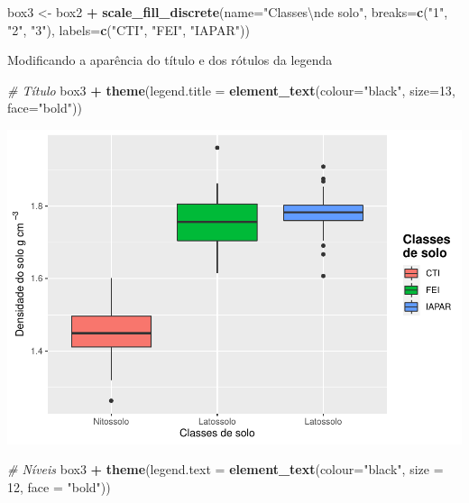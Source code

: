 \documentclass[
]{book}
\newenvironment{Shaded}{\begin{snugshade}}{\end{snugshade}}
\newcommand{\CharTok}[1]{\textcolor[rgb]{0.31,0.60,0.02}{#1}}
\newcommand{\CommentTok}[1]{\textcolor[rgb]{0.56,0.35,0.01}{\textit{#1}}}
\newcommand{\DataTypeTok}[1]{\textcolor[rgb]{0.13,0.29,0.53}{#1}}
\newcommand{\DecValTok}[1]{\textcolor[rgb]{0.00,0.00,0.81}{#1}}
\newcommand{\KeywordTok}[1]{\textcolor[rgb]{0.13,0.29,0.53}{\textbf{#1}}}
\newcommand{\NormalTok}[1]{#1}
\newcommand{\OperatorTok}[1]{\textcolor[rgb]{0.81,0.36,0.00}{\textbf{#1}}}
\newcommand{\StringTok}[1]{\textcolor[rgb]{0.31,0.60,0.02}{#1}}
\begin{document}
\begin{Shaded}
\begin{Highlighting}[]
\NormalTok{box3 <-}\StringTok{ }\NormalTok{box2 }\OperatorTok{+}
\StringTok{        }\KeywordTok{scale_fill_discrete}\NormalTok{(}\DataTypeTok{name=}\StringTok{"Classes}\CharTok{\textbackslash{}n}\StringTok{de solo"}\NormalTok{,}
                          \DataTypeTok{breaks=}\KeywordTok{c}\NormalTok{(}\StringTok{"1"}\NormalTok{, }\StringTok{"2"}\NormalTok{, }\StringTok{"3"}\NormalTok{),}
                          \DataTypeTok{labels=}\KeywordTok{c}\NormalTok{(}\StringTok{"CTI"}\NormalTok{, }\StringTok{"FEI"}\NormalTok{, }\StringTok{"IAPAR"}\NormalTok{))}
\end{Highlighting}
\end{Shaded}

Modificando a aparência do título e dos rótulos da legenda

\begin{Shaded}
\begin{Highlighting}[]
\CommentTok{# Título}
\NormalTok{box3 }\OperatorTok{+}\StringTok{ }\KeywordTok{theme}\NormalTok{(}\DataTypeTok{legend.title =} \KeywordTok{element_text}\NormalTok{(}\DataTypeTok{colour=}\StringTok{"black"}\NormalTok{, }\DataTypeTok{size=}\DecValTok{13}\NormalTok{, }\DataTypeTok{face=}\StringTok{"bold"}\NormalTok{))}
\end{Highlighting}
\end{Shaded}

\includegraphics{TudodoR_files/figure-latex/unnamed-chunk-213-1.pdf}

\begin{Shaded}
\begin{Highlighting}[]
\CommentTok{# Níveis}
\NormalTok{box3 }\OperatorTok{+}\StringTok{ }\KeywordTok{theme}\NormalTok{(}\DataTypeTok{legend.text =} \KeywordTok{element_text}\NormalTok{(}\DataTypeTok{colour=}\StringTok{"black"}\NormalTok{, }\DataTypeTok{size =} \DecValTok{12}\NormalTok{, }\DataTypeTok{face =} \StringTok{"bold"}\NormalTok{))}
\end{Highlighting}
\end{Shaded}
\end{document}
